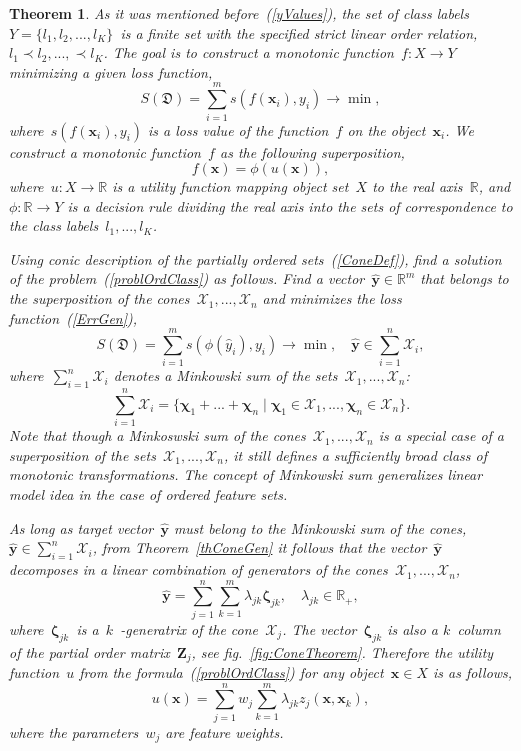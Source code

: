 \documentclass[12pt,preprint]{elsarticle}
\newcommand{\bx}{\mathbf{x}}
\newcommand{\by}{\mathbf{y}}
\newcommand{\bZ}{\mathbf{Z}}
\newcommand{\bchi}{\boldsymbol{\chi}}
\newcommand{\bzeta}{\boldsymbol{\zeta}}
\newtheorem{Theorem}{Theorem}
\begin{document}
\begin{Theorem}
As it was mentioned before~(\ref{yValues}), the set of class labels~$Y=\{l_1,l_2,...,l_K\}$~is a finite set with the specified strict linear order relation,~$l_1\prec l_2,...,\prec l_K$. The goal is to construct a monotonic function~$f:X\rightarrow Y$ minimizing a given loss function,
\begin{equation}
S(\mathfrak{D})=\sum\limits_{i=1}^m{s(f(\bx_i), y_i)}\rightarrow \min,
\label{ErrGen}
\end{equation}
where~$s(f(\bx_i), y_i)$ is a loss value of the function~$f$ on the object~$\bx_i$.
We construct a monotonic function~$f$ as the following superposition,
\begin{equation}
f(\bx)=\phi(u(\bx)),
\label{problOrdClass}
\end{equation}
where~$u:X\rightarrow \mathbb{R}$ is a \emph{utility function} mapping object set~$X$ to the real axis~$\mathbb{R}$, and $\phi:\mathbb{R}\rightarrow Y$ is a \emph{decision rule} dividing the real axis into the sets of correspondence to the class labels~$l_1,...,l_K$.

Using conic description of the partially ordered sets~(\ref{ConeDef}), find a solution of the problem~(\ref{problOrdClass}) as follows. Find a vector~$\hat{\by}\in \mathbb{R}^m$ that belongs to the superposition of the cones~$\mathcal{X}_1,...,\mathcal{X}_n$ and minimizes the loss function~(\ref{ErrGen}),
\[
S(\mathfrak{D})=\sum\limits_{i=1}^m{s(\phi(\hat{y}_i), y_i)}\rightarrow \min,\quad \hat{\by}\in \sum\limits_{i=1}^n\mathcal{X}_i,
\]
where~$\sum\limits_{i=1}^n\mathcal{X}_i$ denotes a Minkowski sum of the sets~$\mathcal{X}_1,...,\mathcal{X}_n$:
\[
\sum\limits_{i=1}^n\mathcal{X}_i=\{\bchi_1+...+\bchi_n\;|\;\bchi_1\in\mathcal{X}_1,...,\bchi_n\in\mathcal{X}_n\}.
\]
Note that though a Minkoswski sum of the cones~$\mathcal{X}_1,...,\mathcal{X}_n$ is a special case of a superposition of the sets~$\mathcal{X}_1,...,\mathcal{X}_n$, it still defines a sufficiently broad class of monotonic transformations. The concept of Minkowski sum generalizes \emph{linear model} idea in the case of ordered feature sets.

As long as target vector~$\hat{\by}$ must belong to the Minkowski sum of the cones,~$\hat{\by}\in \sum\limits_{i=1}^n\mathcal{X}_i$, from Theorem~\ref{thConeGen} it follows that the vector~$\hat{\by}$ decomposes in a linear combination of generators of the cones~$\mathcal{X}_1,...,\mathcal{X}_n$,
\[
\hat{\by}=\sum\limits_{j=1}^n\sum\limits_{k=1}^m\lambda_{jk}\bzeta_{jk},\quad \lambda_{jk}\in\mathbb{R}_+,
\]
where~$\bzeta_{jk}$~is a~$k$~-generatrix of the cone~$\mathcal{X}_j$. The vector~$\bzeta_{jk}$ is also a $k$~column of the partial order matrix~$\bZ_j$, see fig.~\ref{fig:ConeTheorem}.
Therefore the utility function~$u$ from the formula~(\ref{problOrdClass}) for any object~$\bx\in X$ is as follows,
\begin{equation}
u(\bx) = \sum\limits_{j=1}^n w_j \sum\limits_{k=1}^m\lambda_{jk}z_j(\bx, \bx_k),
\label{utilityDecomp}
\end{equation}
where the parameters~$w_j$ are feature weights.


\end{Theorem}
\end{document}
